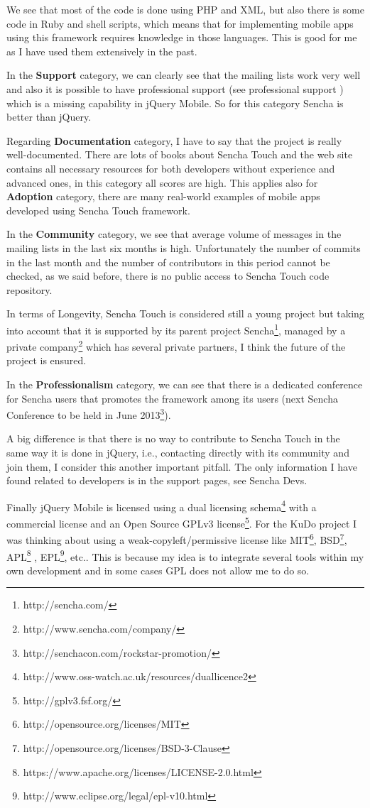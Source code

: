 \documentclass[a4paper,12pt]{book}
\begin{document}
We see that most of the code is done using PHP and XML, but also there is some code in Ruby and shell scripts, which means that for implementing mobile apps using this framework requires knowledge in those languages. This is good for me as I have used them extensively in the past.

In the \textbf{Support} category, we can clearly see that the mailing lists work very well and also it is possible to have professional support (see professional support \cite{sencha support}) which is a missing capability in jQuery Mobile. So for this category Sencha is better than jQuery.

Regarding \textbf{Documentation} category, I have to say that the project is really well-documented. There are lots of books about Sencha Touch and the web site contains all necessary resources for both developers without experience and advanced ones, in this category all scores are high. This applies also for \textbf{Adoption} category, there are many real-world examples of mobile apps developed using Sencha Touch framework.

In the \textbf{Community} category, we see that average volume of messages in the mailing lists in the last six months is high. Unfortunately the number of commits in the last month and the number of contributors in this period cannot be checked, as we said before, there is no public access to Sencha Touch code repository. 

In terms of Longevity, Sencha Touch is considered still a young project but taking into account that it is supported by its parent project Sencha\footnote{http://sencha.com/}, managed by a private company\footnote{http://www.sencha.com/company/}  which has several private partners, I think the future of the project is ensured.

In the \textbf{Professionalism} category, we can see that there is a dedicated conference for Sencha users\cite{sencha Conferences} that promotes the framework among its users  (next Sencha Conference to be held in June 2013\footnote{http://senchacon.com/rockstar-promotion/}).

A big difference is that there is no way to contribute to Sencha Touch in the same way it is done in jQuery, i.e., contacting directly with its community and join them, I consider this another important pitfall. The only information I have found related to developers is in the support pages, see Sencha Devs\cite{sencha Devs}.  

Finally jQuery Mobile is licensed using a dual licensing schema\footnote{http://www.oss-watch.ac.uk/resources/duallicence2}  with a commercial license and an Open Source GPLv3 license\footnote{http://gplv3.fsf.org/}. For the KuDo project I was thinking about using a weak-copyleft/permissive license like MIT\footnote{http://opensource.org/licenses/MIT}, BSD\footnote{http://opensource.org/licenses/BSD-3-Clause}, APL\footnote{https://www.apache.org/licenses/LICENSE-2.0.html} , EPL\footnote{http://www.eclipse.org/legal/epl-v10.html}, etc.. This is because my idea is to integrate several tools within my own development and in some cases GPL does not allow me to do so. 
\end{document}
